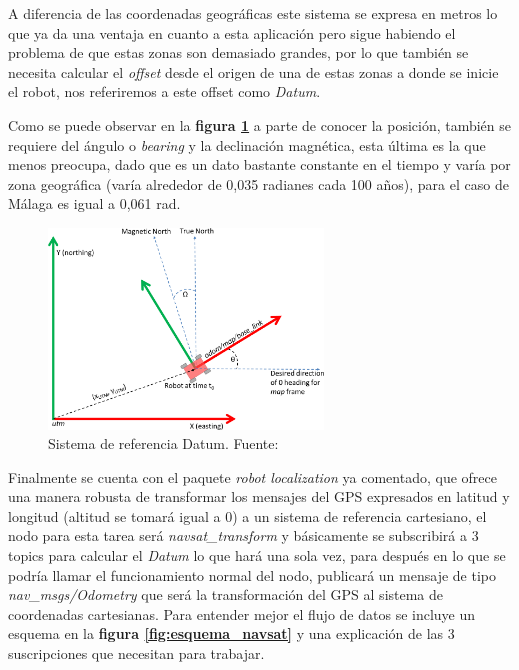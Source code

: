 A diferencia de las coordenadas geográficas este sistema se expresa en metros lo que ya da una ventaja en cuanto a esta aplicación pero 
sigue habiendo el problema de que estas zonas son demasiado grandes, por lo que también se necesita calcular el \textit{offset} desde el 
origen de una de estas zonas a donde se inicie el robot, nos referiremos a este offset como \textit{Datum}.

Como se puede observar en la \textbf{figura \ref{fig:datum}} a parte de conocer la posición, también se requiere del ángulo o \textit{bearing} 
y la declinación magnética, esta última es la que menos preocupa, dado que es un dato bastante constante en el tiempo y varía por 
zona geográfica (varía alrededor de 0,035 radianes cada 100 años), para el caso de Málaga es igual a 0,061 rad.



\begin{figure}[h]
    \centering
    \includegraphics[width=0.65\textwidth]{images/navsat_transform.png}
    \caption{Sistema de referencia Datum. Fuente: \cite{nav2}}
    \label{fig:datum}
\end{figure}

Finalmente se cuenta con el paquete \textit{robot localization} ya comentado, que 
ofrece una manera robusta de transformar los mensajes del GPS expresados en latitud y longitud (altitud se tomará igual a 0) a un 
sistema de referencia cartesiano, el nodo para esta tarea será \textit{navsat\_transform} y básicamente se subscribirá a 3 topics para calcular 
el \textit{Datum} lo que hará una sola vez, para después en lo que se podría llamar el funcionamiento normal del nodo, publicará un mensaje de tipo 
\textit{nav\_msgs/Odometry} que será la transformación del GPS al sistema de coordenadas cartesianas. Para entender mejor el flujo de datos se incluye 
un esquema en la \textbf{figura \ref{fig:esquema_navsat}} y una explicación de las 3 suscripciones que necesitan para trabajar.

